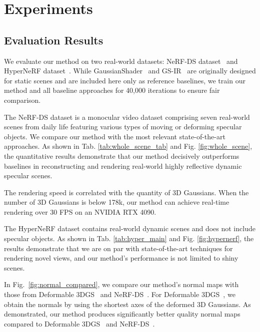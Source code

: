 \section{Experiments}
\label{sec:experinment}
\subsection{Evaluation Results}
We evaluate our method on two real-world datasets: NeRF-DS dataset~\citep{yan2023nerf} and HyperNeRF dataset~\citep{park2021hypernerf}. While GaussianShader~\citep{jiang2023gaussianshader} and GS-IR~\citep{liang2023gs} are originally designed for static scenes and are included here only as reference baselines, we train our method and all baseline approaches for 40,000 iterations to ensure fair comparison. 




\vspace{3pt}  
 The NeRF-DS dataset \citep{yan2023nerf} is a monocular video dataset comprising seven real-world scenes from daily life featuring various types of moving or deforming specular objects. We compare our method with the most relevant state-of-the-art approaches. As shown in Tab. \ref{tab:whole_scene_tab} and Fig. \ref{fig:whole_scene}, the quantitative results demonstrate that our method decisively outperforms baselines in reconstructing and rendering real-world highly reflective dynamic specular scenes. 
 
 The rendering speed is correlated with the quantity of 3D Gaussians. When the number of 3D Gaussians is below 178k, our method can achieve real-time rendering over 30 FPS on an NVIDIA RTX 4090.




\vspace{3pt}  
The HyperNeRF dataset contains real-world dynamic scenes and does not include specular objects. As shown in Tab. \ref{tab:hyper_main} and Fig. \ref{fig:hypernerf}, the results demonstrate that we are on par with state-of-the-art techniques for rendering novel views, and our method's performance is not limited to shiny scenes.

% 
% 

In Fig.~\ref{fig:normal_compared}, we compare our method's normal maps with those from Deformable 3DGS~\citep{yang2023deformable} and NeRF-DS~\citep{yan2023nerf}. For Deformable 3DGS~\citep{yang2023deformable}, we obtain the normals by using the shortest axes of the deformed 3D Gaussians. As demonstrated, our method produces significantly better quality normal maps compared to Deformable 3DGS~\citep{yang2023deformable} and NeRF-DS~\citep{yan2023nerf}.

